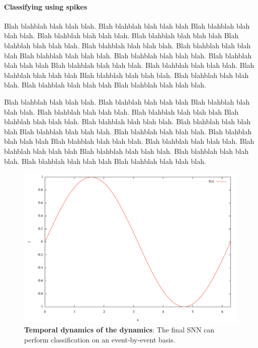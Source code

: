 \documentclass[12pt]{article}
\begin{document}
\paragraph*{Classifying using spikes}
Blah blahblah blah blah blah. Blah blahblah blah blah blah Blah blahblah blah blah blah.
Blah blahblah blah blah blah. Blah blahblah blah blah blah Blah blahblah blah blah blah.
Blah blahblah blah blah blah. Blah blahblah blah blah blah Blah blahblah blah blah blah.
Blah blahblah blah blah blah. Blah blahblah blah blah blah Blah blahblah blah blah blah.
Blah blahblah blah blah blah. Blah blahblah blah blah blah Blah blahblah blah blah blah.
Blah blahblah blah blah blah. Blah blahblah blah blah blah Blah blahblah blah blah blah.


Blah blahblah blah blah blah. Blah blahblah blah blah blah Blah blahblah blah blah blah.
Blah blahblah blah blah blah. Blah blahblah blah blah blah Blah blahblah blah blah blah.
Blah blahblah blah blah blah. Blah blahblah blah blah blah Blah blahblah blah blah blah.
Blah blahblah blah blah blah. Blah blahblah blah blah blah Blah blahblah blah blah blah.
Blah blahblah blah blah blah. Blah blahblah blah blah blah Blah blahblah blah blah blah.
Blah blahblah blah blah blah. Blah blahblah blah blah blah Blah blahblah blah blah blah.


\begin{figure}[!ht]%
\includegraphics[width=.99\linewidth, height=.3\linewidth]{figure1.pdf}
\caption
{
\textbf{Temporal dynamics of the dynamics}: The final SNN can perform classification on an event-by-event basis. 
\label{fig:fig2}
}
\end{figure}



\vfil


\printbibliography
\end{document}
